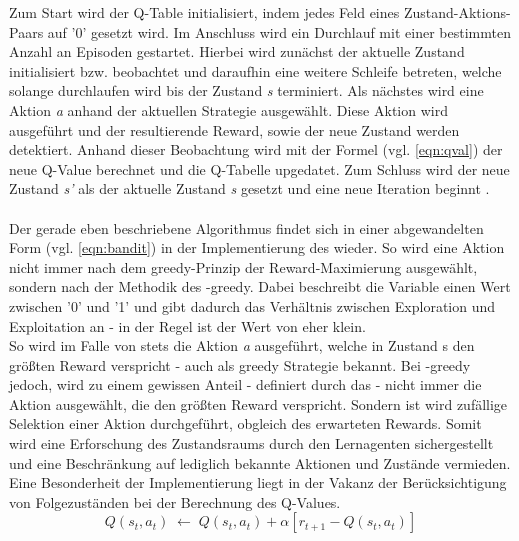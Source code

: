 Zum Start wird der Q-Table initialisiert, indem jedes Feld eines Zustand-Aktions-Paars auf '0' gesetzt wird. Im Anschluss wird ein Durchlauf mit einer bestimmten Anzahl an Episoden gestartet. Hierbei wird zunächst der aktuelle Zustand initialisiert bzw. beobachtet und daraufhin eine weitere Schleife betreten, welche solange durchlaufen wird bis der Zustand \textit{s}  terminiert. Als nächstes wird eine Aktion \textit{a}  anhand der aktuellen Strategie ausgewählt. Diese Aktion wird ausgeführt und der resultierende Reward, sowie der neue Zustand werden detektiert. Anhand dieser Beobachtung wird mit der Formel (vgl. \ref{eqn:qval}) der neue Q-Value berechnet und die Q-Tabelle upgedatet. Zum Schluss wird der neue Zustand \textit{s'} als der 
aktuelle Zustand \textit{s} gesetzt und eine neue Iteration beginnt \cite{Sutton, mlmitchel, MultiagentSystems}. \\\\
Der gerade eben beschriebene Algorithmus findet sich in einer abgewandelten Form (vgl. \ref{eqn:bandit}) in der Implementierung des  wieder. So wird eine Aktion nicht immer nach dem greedy-Prinzip der Reward-Maximierung ausgewählt, sondern nach der Methodik des \textit{\textepsilon}-greedy. Dabei beschreibt die Variable \textit{\textepsilon} einen Wert zwischen '0' und '1' und gibt dadurch das Verhältnis zwischen Exploration und Exploitation an - in der Regel ist der Wert von \textit{\textepsilon} eher klein. \\
So wird im Falle von  stets die Aktion \textit{a} ausgeführt, welche in Zustand s den größten Reward verspricht - auch als greedy Strategie bekannt. Bei \textit{\textepsilon}-greedy jedoch, wird zu einem gewissen Anteil - definiert durch das \textit{\textepsilon} - nicht immer die Aktion ausgewählt, die den größten Reward verspricht. Sondern ist wird zufällige Selektion einer Aktion durchgeführt,  obgleich des erwarteten Rewards. Somit wird eine Erforschung des Zustandsraums durch den Lernagenten sichergestellt und eine Beschränkung auf lediglich bekannte Aktionen und Zustände vermieden. \\
Eine Besonderheit der Implementierung liegt in der Vakanz der Berücksichtigung von Folgezuständen bei der Berechnung des Q-Values.
\begin{equation} \label{eqn:bandit}
		Q(s_t,a_t)\;\leftarrow\;Q(s_t,a_t) + \alpha [ r_{t+1} - Q(s_t,a_t) ]
\end{equation}


